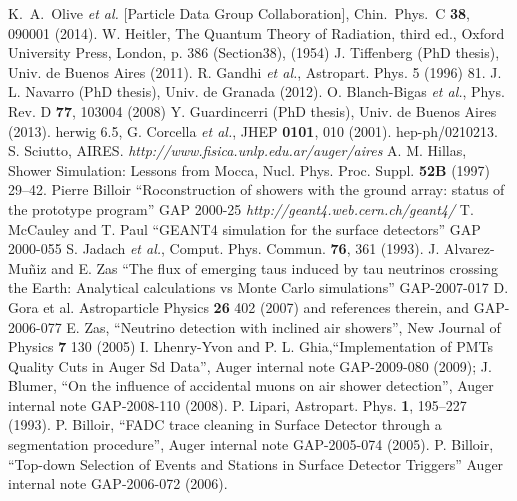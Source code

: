 \begin{thebibliography}{1}
 K.~A.~Olive {\it et al.}  [Particle Data Group Collaboration], Chin.\ Phys.\ C {\bf 38}, 090001 (2014).
 W. Heitler, The Quantum Theory of Radiation, third ed., Oxford University Press, London, p. 386 (Section38), (1954)
 J. Tiffenberg (PhD thesis), Univ. de Buenos Aires (2011).
 R. Gandhi {\it et al.}, Astropart. Phys. 5 (1996) 81.
 J. L. Navarro (PhD thesis), Univ. de Granada (2012).
 O. Blanch-Bigas {\it et al.}, Phys. Rev. D \textbf{77}, 103004 (2008)
 Y. Guardincerri (PhD thesis), Univ. de Buenos Aires (2013).
 {\sc herwig 6.5}, G. Corcella {\it et al.}, JHEP \textbf{0101}, 010 (2001). hep-ph/0210213.
 S. Sciutto, AIRES. \emph{http://www.fisica.unlp.edu.ar/auger/aires}
 A. M. Hillas, Shower Simulation: Lessons from Mocca, Nucl. Phys. Proc. Suppl. \textbf{52B} (1997) 29–42.
 Pierre Billoir ``Roconstruction of showers with the ground array: status of the prototype program'' GAP 2000-25 
 \emph{http://geant4.web.cern.ch/geant4/}
 T. McCauley and T. Paul ``GEANT4 simulation for the surface detectors'' GAP 2000-055
 S. Jadach {\it et al.}, Comput. Phys. Commun. {\bf 76}, 361 (1993).
 J. Alvarez-Mu\~niz and E. Zas ``The flux of emerging taus induced by tau neutrinos crossing the Earth: Analytical calculations vs Monte Carlo simulations'' GAP-2007-017 
 D. Gora et al. Astroparticle Physics \textbf{26} 402 (2007) and references therein, and GAP-2006-077
 E. Zas, ``Neutrino detection with inclined air showers'', New Journal of Physics \textbf{7} 130 (2005)
 I. Lhenry-Yvon and P. L. Ghia,``Implementation of PMTs Quality Cuts in Auger Sd Data'', Auger internal note GAP-2009-080 (2009);
 J. Blumer, ``On the influence of accidental muons on air shower detection'', Auger internal note GAP-2008-110 (2008).
 P. Lipari, Astropart. Phys. \textbf{1}, 195–227 (1993).
  P. Billoir, ``FADC trace cleaning in Surface Detector through a segmentation procedure'', Auger internal note GAP-2005-074 (2005).
  P. Billoir, ``Top-down Selection of Events and Stations in Surface Detector Triggers'' Auger internal note GAP-2006-072 (2006).

\end{thebibliography}
